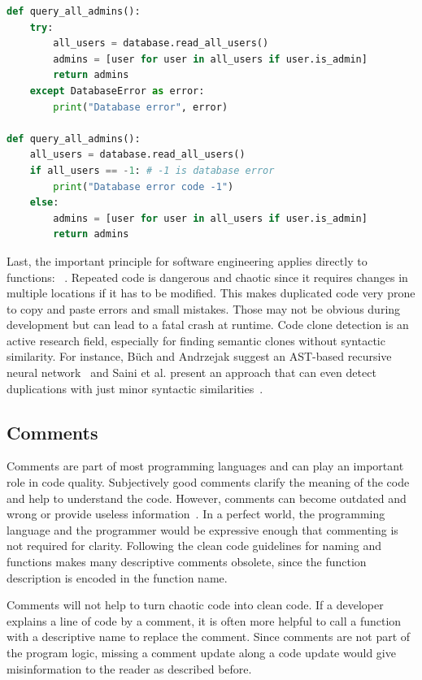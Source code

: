 \begin{lstlisting}[float=t , language=Python, label=lst:error_catching, caption={Sample listing for error handling with try and except statements vs error codes.}]
def query_all_admins():
    try:
        all_users = database.read_all_users()
        admins = [user for user in all_users if user.is_admin]
        return admins
    except DatabaseError as error:
        print("Database error", error)

def query_all_admins():
    all_users = database.read_all_users()
    if all_users == -1: # -1 is database error
        print("Database error code -1")
    else:
        admins = [user for user in all_users if user.is_admin]
        return admins
\end{lstlisting}


Last, the important principle for software engineering applies directly to functions: ~\cite{haoyu_basic_2012}. Repeated code is dangerous and chaotic since it requires changes in multiple locations if it has to be modified. This makes duplicated code very prone to copy and paste errors and small mistakes. Those may not be obvious during development but can lead to a fatal crash at runtime. Code clone detection is an active research field, especially for finding semantic clones without syntactic similarity. For instance, Büch and Andrzejak suggest an AST-based recursive neural network~\cite{buch_learning-based_2019} and Saini et al. present an approach that can even detect duplications with just minor syntactic similarities~\cite{saini_oreo_2018}.

\subsection{Comments}
Comments are part of most programming languages and can play an important role in code quality. Subjectively good comments clarify the meaning of the code and help to understand the code. However, comments can become outdated and wrong or provide useless information~\cite{martin_clean_2009}. In a perfect world, the programming language and the programmer would be expressive enough that commenting is not required for clarity. Following the clean code guidelines for naming and functions makes many descriptive comments obsolete, since the function description is encoded in the function name.

Comments will not help to turn chaotic code into clean code. If a developer explains a line of code by a comment, it is often more helpful to call a function with a descriptive name to replace the comment. Since comments are not part of the program logic, missing a comment update along a code update would give misinformation to the reader as described before.

